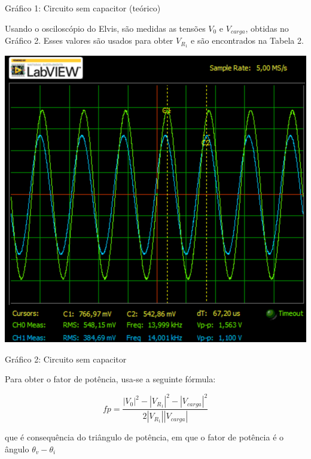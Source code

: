 \documentclass[a4 paper]{article}
\begin{document}
\begin{center}
Gráfico 1: Circuito sem capacitor (teórico)
\end{center}

\newpage
Usando o osciloscópio do Elvis, são medidas as tensões $V_0$ e $V_{carga}$, obtidas no Gráfico 2. Esses valores são usados para obter $V_{R_1}$ e são encontrados na Tabela 2. 



\begin{table}[h]
\centering
\includegraphics[scale=0.38]{rgadicoas/rgadicoa1}
\end{table}

\begin{center}
Gráfico 2: Circuito sem capacitor
\end{center}




Para obter o fator de potência, usa-se a seguinte fórmula:

\[fp = \frac{|V_0|^2-|V_{R_1}|^2-|V_{carga}|^2}{2|V_{R_1}||V_{carga}|}\]

que é consequência do triângulo de potência, em que o fator de potência é o ângulo $\theta_v-\theta_i$



\begin{center}
\end{center}
\end{document}
